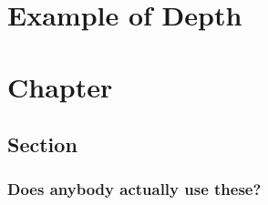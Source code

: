 \documentclass{depth_book}
\begin{document}
\chapter*{Example of Depth}
\blindtext[2]

\chapter{Chapter}
\blindtext[2]
\section{Section}
\blindtext[2]
\subsection{Does anybody actually use these?}
\end{document}
